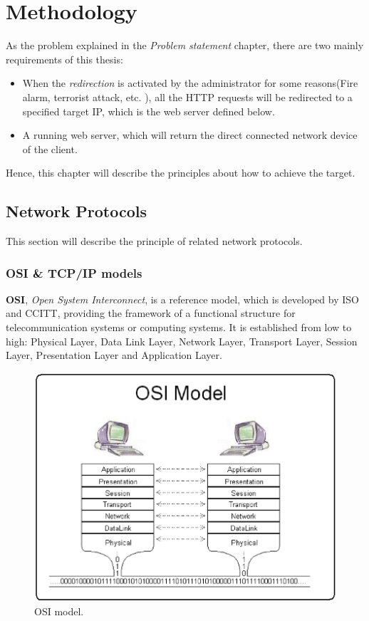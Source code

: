 \newpage
\chapter{Methodology}

As the problem explained in the \textit{Problem statement} chapter, there are two mainly requirements of this thesis:

\begin{itemize}
	\item When the \textit{redirection} is activated by the administrator for some reasons(Fire alarm, terrorist attack, etc. ), all the HTTP requests will be redirected to a specified target IP, which is the web server defined below.
	\item A running web server, which will return the direct connected network device of the client.
\end{itemize}

Hence, this chapter will describe the principles about how to achieve the target.

\section{Network Protocols}

This section will describe the principle of related network protocols.

\subsection{OSI \& TCP/IP models}

\textbf{OSI}, \textit{Open System Interconnect}, is a reference model, which is developed by ISO and CCITT, providing the framework of a functional structure for telecommunication systems or computing systems. It is established from low to high: Physical Layer, Data Link Layer, Network Layer, Transport Layer, Session Layer, Presentation Layer and Application Layer.

\begin{figure}[!ht]
	\caption{OSI model.}
	\includegraphics[width=\textwidth]{images/osi_model}
\end{figure}

